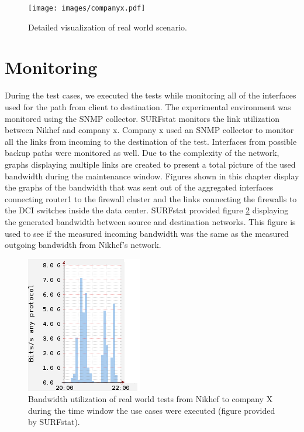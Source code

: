 \begin{figure}[H] 
  \texttt{[image: images/companyx.pdf]}
  \caption{Detailed visualization of real world scenario.}
  \label{fig:companyx}
\end{figure}

\section{Monitoring}\label{sec:monitoring}
During the test cases, we executed the tests while monitoring all of the interfaces used for the path from client to destination.
The experimental environment was monitored using the SNMP collector. SURFstat monitors the link utilization between Nikhef and company x. Company x used an SNMP collector to monitor all the links from incoming to the destination of the test.    
Interfaces from possible backup paths were monitored as well. 
Due to the complexity of the network, graphs displaying multiple links are created to present a total picture of the used bandwidth during the maintenance window.
Figures shown in this chapter display the graphs of the bandwidth that was sent out of the aggregated interfaces connecting router1 to the firewall cluster and the links connecting the firewalls to the DCI switches inside the data center. 
SURFstat provided figure \ref{fig:surftest} displaying the generated bandwidth between source and destination networks.
This figure is used to see if the measured incoming bandwidth was the same as the measured outgoing bandwidth from Nikhef's network.

\begin{center}
\begin{figure}[H]
  \includegraphics[scale=0.8]{images/test-link-usage.png}
  \caption{Bandwidth utilization of real world tests from Nikhef to company X during the time window the use cases were executed (figure provided by SURFstat).}
  \label{fig:surftest}
\end{figure}
\end{center}

